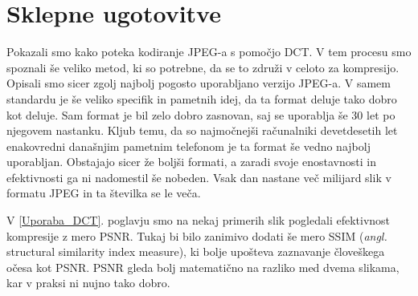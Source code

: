 \documentclass[a4paper,12pt,openright]{book}
\begin{document}
\chapter{Sklepne ugotovitve}
Pokazali smo kako poteka kodiranje JPEG-a s pomočjo DCT. V tem procesu smo spoznali še veliko metod, ki so potrebne, da se to združi v celoto za kompresijo. Opisali smo sicer zgolj najbolj pogosto uporabljano verzijo JPEG-a. V samem standardu je še veliko specifik in pametnih idej, da ta format deluje tako dobro kot deluje. Sam format je bil zelo dobro zasnovan, saj se uporablja še 30 let po njegovem nastanku. Kljub temu, da so najmočnejši računalniki devetdesetih let enakovredni današnjim pametnim telefonom je ta format še vedno najbolj uporabljan. Obstajajo sicer že boljši formati, a zaradi svoje enostavnosti in efektivnosti ga ni nadomestil še nobeden. Vsak dan nastane več milijard slik v formatu JPEG in ta številka se le veča.\par
V \ref{Uporaba_DCT}. poglavju smo na nekaj primerih slik pogledali efektivnost kompresije z mero PSNR. Tukaj bi bilo zanimivo dodati še mero SSIM (\textit{angl.} structural similarity index measure), ki bolje upošteva zaznavanje človeškega očesa kot PSNR. PSNR gleda bolj matematično na razliko med dvema slikama, kar v praksi ni nujno tako dobro. 


\printbibliography[heading=bibintoc,title={Literatura}]
\end{document}

